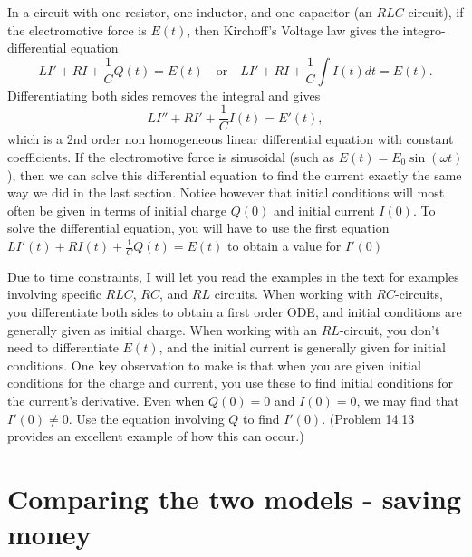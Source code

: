 In a circuit  with one resistor, one inductor, and one capacitor (an $RLC$ circuit), if the electromotive force is $E(t)$, then Kirchoff's Voltage law gives the integro-differential equation 
$$L I'+ RI+ \frac{1}{C}Q(t) =E(t) \quad \text{or}\quad L I'+ RI+ \frac{1}{C}\int I(t) dt = E(t).$$  
Differentiating both sides removes the integral and gives
$$L I''+ RI'+ \frac{1}{C}I(t) = E'(t),$$ which is a 2nd order non homogeneous linear differential equation with constant coefficients. 
If the electromotive force is sinusoidal (such as $E(t) = E_0\sin(\omega t)$), then we can solve this differential equation to find the current exactly the same way we did in the last section. Notice however that initial conditions will most often be given in terms of initial charge $Q(0)$ and initial current $I(0)$.  To solve the differential equation, you will have to use the first equation $ L I'(t)+ RI(t)+ \frac{1}{C}Q(t) =E(t)$ to obtain a value for $I'(0)$

Due to time constraints, I will let you read the examples in the text for examples involving specific $RLC$, $RC$, and $RL$ circuits. When working with $RC$-circuits, you differentiate both sides to obtain a first order ODE, and initial conditions are generally given as initial charge.  When working with an $RL$-circuit, you don't need to differentiate $E(t)$, and the initial current is generally given for initial conditions. One key observation to make is that when you are given initial conditions for the charge and current, you use these to find initial conditions for the current's derivative. Even when $Q(0)=0$ and $I(0)=0$, we may find that $I'(0)\neq 0$. Use the equation involving $Q$ to find $I'(0)$. (Problem 14.13 provides an excellent example of how this can occur.) 

\section{Comparing the two models - saving money}

